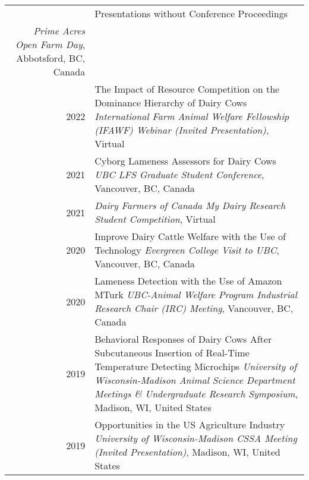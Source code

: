 \documentclass[letterpaper, 11pt]{article}
\newcommand{\headingfont}{\Large\color{OliveGreen}}
\newenvironment{SectionTable}[1]{
	\renewcommand*{\arraystretch}{1.7}
	\setlength{\tabcolsep}{10pt}
	\begin{longtable}{Rp{5.2in}} & #1 \\}
{\end{longtable}\vspace{-.3cm}}
\begin{document}
\begin{SectionTable}{\headingfont Presentations without Conference Proceedings}
\textit{Prime Acres Open Farm Day}, Abbotsford, BC, Canada \\
2022 &
The Impact of Resource Competition on the Dominance Hierarchy of Dairy Cows \newline
\textit{International Farm Animal Welfare Fellowship (IFAWF) Webinar (Invited Presentation)}, Virtual \\
2021 &
Cyborg Lameness Assessors for Dairy Cows \newline
\textit{UBC LFS Graduate Student Conference}, Vancouver, BC, Canada \\
2021 &
 \newline
\textit{Dairy Farmers of Canada My Dairy Research Student Competition}, Virtual \\
2020 &
Improve Dairy Cattle Welfare with the Use of Technology \newline
\textit{Evergreen College Visit to UBC}, Vancouver, BC, Canada \\
2020 &
Lameness Detection with the Use of Amazon MTurk \newline
\textit{UBC-Animal Welfare Program Industrial Research Chair (IRC) Meeting}, Vancouver, BC, Canada \\
2019 &
Behavioral Responses of Dairy Cows After Subcutaneous Insertion of Real-Time Temperature Detecting Microchips \newline
\textit{University of Wisconsin-Madison Animal Science Department Meetings \& Undergraduate Research Symposium}, Madison, WI, United States \\
2019 &
Opportunities in the US Agriculture Industry \newline
\textit{University of Wisconsin-Madison CSSA Meeting (Invited Presentation)}, Madison, WI, United States \\
\end{SectionTable}
\end{document}
